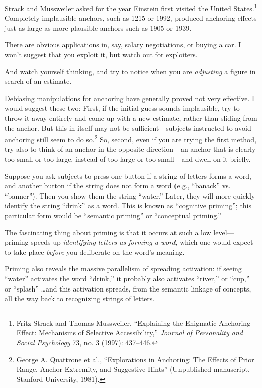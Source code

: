 {
 Strack and Mussweiler asked for the year Einstein first visited
the United States.\footnote{Fritz Strack and Thomas Mussweiler,
``Explaining the Enigmatic Anchoring Effect:
Mechanisms of Selective Accessibility,''
\textit{Journal of Personality and Social Psychology} 73, no. 3 (1997):
437--446.} Completely implausible anchors,
such as 1215 or 1992, produced anchoring effects just as large as more
plausible anchors such as 1905 or 1939.}

{
 There are obvious applications in, say, salary negotiations, or
buying a car. I won't suggest that you exploit it, but
watch out for exploiters.}

{
 And watch yourself thinking, and try to notice when you are
\textit{adjusting} a figure in search of an estimate.}

{
 Debiasing manipulations for anchoring have generally proved not
very effective. I would suggest these two: First, if the initial guess
sounds implausible, try to throw it away entirely and come up with a
new estimate, rather than sliding from the anchor. But this in itself
may not be sufficient---subjects instructed to avoid anchoring still
seem to do so.\footnote{George A. Quattrone et al., ``Explorations in
Anchoring: The Effects of Prior Range, Anchor Extremity, and Suggestive
Hints'' (Unpublished manuscript, Stanford University,
1981).} So, second, even if you are trying
the first method, try also to think of an anchor in the opposite
direction---an anchor that is clearly too small or too large, instead
of too large or too small---and dwell on it briefly.}

\myendsectiontext


\bigskip


{
 Suppose you ask subjects to press one button if a string of
letters forms a word, and another button if the string does not form a
word (e.g., ``banack'' vs.
``banner''). Then you show them the
string ``water.'' Later, they will
more quickly identify the string
``drink'' as a word. This is known
as ``cognitive priming''; this
particular form would be ``semantic
priming'' or ``conceptual
priming.'' }

{
 The fascinating thing about priming is that it occurs at such a
low level---priming speeds up \textit{identifying letters as forming a
word}, which one would expect to take place \textit{before} you
deliberate on the word's meaning.}

{
 Priming also reveals the massive parallelism of spreading
activation: if seeing ``water''
activates the word ``drink,'' it
probably also activates ``river,''
or ``cup,'' or
``splash'' \ldots and this activation
spreads, from the semantic linkage of concepts, all the way back to
recognizing strings of letters.}

